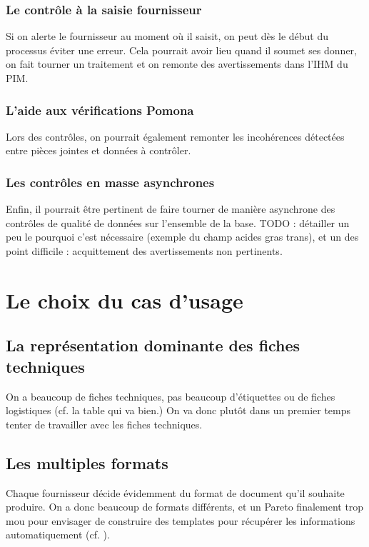             \subsection{Le contrôle à la saisie fournisseur}
            Si on alerte le fournisseur au moment où il saisit, on peut dès le début du processus éviter une erreur.
            Cela pourrait avoir lieu quand il soumet ses donner, on fait tourner un traitement et on remonte des avertissements dans l'IHM du PIM.

            \subsection{L'aide aux vérifications Pomona}
            Lors des contrôles, on pourrait également remonter les incohérences détectées entre pièces jointes et données à contrôler.

            \subsection{Les contrôles en masse asynchrones}
            Enfin, il pourrait être pertinent de faire tourner de manière asynchrone des contrôles de qualité de données sur l'ensemble de la base.
            TODO : détailler un peu le pourquoi c'est nécessaire (exemple du champ acides gras trans), et un des point difficile : acquittement des avertissements non pertinents.

    \chapter{Le choix du cas d'usage}

        \section{La représentation dominante des fiches techniques}
        On a beaucoup de fiches techniques, pas beaucoup d'étiquettes ou de fiches logistiques (cf. la table qui va bien.)
        On va donc plutôt dans un premier temps tenter de travailler avec les fiches techniques.

        \section{Les multiples formats}
        
        Chaque fournisseur décide évidemment du format de document qu'il souhaite produire.
        On a donc beaucoup de formats différents, et un Pareto finalement trop \og mou \fg pour envisager de construire des templates pour récupérer les informations automatiquement (cf. ).
    
